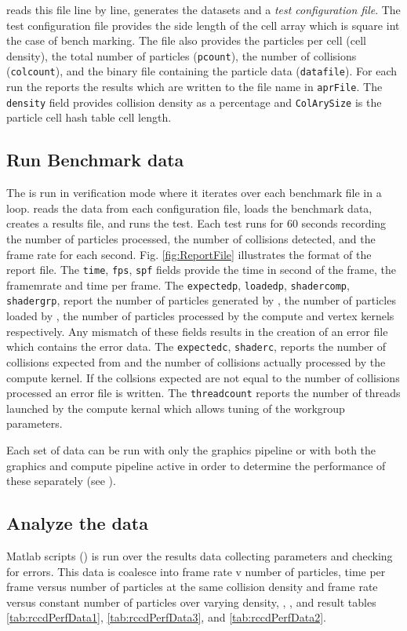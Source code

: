 \gen reads this file line by line, generates the datasets and a \textit{test configuration file}. The test configuration file provides the side length of the cell array which is square int the case of bench marking. The file also provides the particles per cell (cell density), the total number of particles (\texttt{pcount}), the number of collisions (\texttt{colcount}), and the binary file containing the particle data (\texttt{datafile}). For each run the \app{} reports the results which are written to the file name in \texttt{aprFile}. The \texttt{density} field provides collision density as a percentage and \texttt{ColArySize} is the particle cell hash table cell length. 



\subsection{Run Benchmark data}

The \app{} is run in verification mode where it iterates over each benchmark file in a loop. \app{} reads the data from each configuration file, loads the benchmark data, creates a results file, and runs the test. Each test runs for 60 seconds recording the number of particles processed, the number of collisions detected, and the frame rate for each second. Fig. \ref{fig:ReportFile} illustrates the format of the report file.  The \texttt{time}, \texttt{fps},  \texttt{spf} fields provide the time in second of the frame, the framemrate and time per frame. The \texttt{expectedp}, \texttt{loadedp},  \texttt{shadercomp},  \texttt{shadergrp}, report the number of particles generated by \gen{}, the number of particles loaded by \app{}, the number of particles processed by the compute and vertex kernels respectively. Any mismatch of these fields results in the creation of an error file which contains the error data. The \texttt{expectedc}, \texttt{shaderc}, reports the number of collisions expected from \gen{} and the number of collisions actually processed by the compute kernel. If the collsions expected are not equal to the number of collisions processed an error file is written. The \texttt{threadcount} reports the number of threads launched by the compute kernal which allows tuning of the workgroup parameters. 

Each set of data can be run with only the graphics pipeline or with both the graphics and compute pipeline active in order to determine the performance of these separately (see ).





\subsection{Analyze the data}

Matlab scripts (\mat{}) is run over the results data collecting parameters and checking for errors. This data is coalesce into frame rate v number of particles, time per frame versus number of particles at the same collision density and frame rate versus constant number of particles over varying density, , , and result tables \ref{tab:rccdPerfData1}, \ref{tab:rccdPerfData3}, and \ref{tab:rccdPerfData2}.
